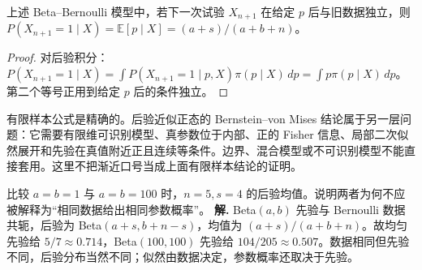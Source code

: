 \begin{proposition}[后验预测]
上述 Beta--Bernoulli 模型中，若下一次试验 \(X_{n+1}\) 在给定 \(p\) 后与旧数据独立，则
\(P(X_{n+1}=1\mid X)=\mathbb E[p\mid X]=(a+s)/(a+b+n)\)。
\end{proposition}
\begin{proof}
对后验积分：
\(P(X_{n+1}=1\mid X)=
\int P(X_{n+1}=1\mid p,X)\pi(p\mid X)\,dp
=\int p\pi(p\mid X)\,dp\)。
第二个等号正用到给定 \(p\) 后的条件独立。
\end{proof}

有限样本公式是精确的。后验近似正态的 Bernstein--von Mises 结论属于另一层问题：它需要有限维可识别模型、真参数位于内部、正的 Fisher 信息、局部二次似然展开和先验在真值附近正且连续等条件。边界、混合模型或不可识别模型不能直接套用。这里不把渐近口号当成上面有限样本结论的证明。



\par
\begin{workedexample}
比较 \(a=b=1\) 与 \(a=b=100\) 时，\(n=5,s=4\) 的后验均值。说明两者为何不应被解释为“相同数据给出相同参数概率”。
\textbf{解.} Beta\((a,b)\) 先验与 Bernoulli 数据共轭，后验为 Beta\((a+s,b+n-s)\)，均值为 \((a+s)/(a+b+n)\)。故均匀先验给 \(5/7\approx0.714\)，Beta\((100,100)\) 先验给 \(104/205\approx0.507\)。数据相同但先验不同，后验分布当然不同；似然由数据决定，参数概率还取决于先验。
\end{workedexample}
\par
